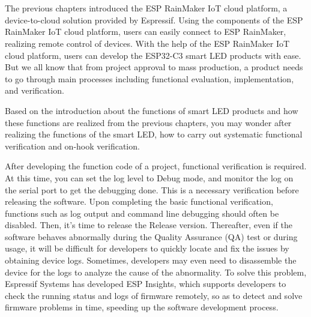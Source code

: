 \documentclass[a4paper,12pt]{book}
\begin{document}

\chapter[ESP Insights: Remote Monitoring Platform]{}

\vspace{36pt}
The previous chapters introduced the ESP RainMaker IoT cloud platform, a device-to-cloud solution provided by Espressif. Using the components of the ESP RainMaker IoT cloud platform, users can easily connect to ESP RainMaker, realizing remote control of devices. With the help of the ESP RainMaker IoT cloud platform, users can develop the ESP32-C3 smart LED products with ease. But we all know that from project approval to mass production, a product needs to go through main processes including functional evaluation, implementation, and verification.

Based on the introduction about the functions of smart LED products and how these functions are realized from the previous chapters, you may wonder after realizing the functions of the smart LED, how to carry out systematic functional verification and on-hook verification.

After developing the function code of a project, functional verification is required. At this time, you can set the log level to Debug mode, and monitor the log on the serial port to get the debugging done. This is a necessary verification before releasing the software. Upon completing the basic functional verification, functions such as log output and command line debugging should often be disabled. Then, it’s time to release the Release version. Thereafter, even if the software behaves abnormally during the Quality Assurance (QA) test or during usage, it will be difficult for developers to quickly locate and fix the issues by obtaining device logs. Sometimes, developers may even need to disassemble the device for the logs to analyze the cause of the abnormality. To solve this problem, Espressif Systems has developed ESP Insights, which supports developers to check the running status and logs of firmware remotely, so as to detect and solve firmware problems in time, speeding up the software development process.
\end{document}
